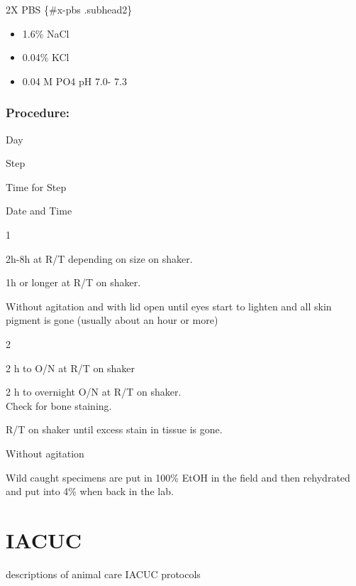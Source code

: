 \documentclass[
]{book}
\providecommand{\tightlist}{%
  \setlength{\itemsep}{0pt}\setlength{\parskip}{0pt}}
\begin{document}
2X PBS \{\#x-pbs .subhead2\}

\begin{itemize}
\tightlist
\item
  1.6\% NaCl
\item
  0.04\% KCl
\item
  0.04 M PO4 pH 7.0- 7.3
\end{itemize}

\hypertarget{procedure-9}{%
\subsection{Procedure:}\label{procedure-9}}

Day

Step

Time for Step

Date and Time

1

2h-8h at R/T depending on size on shaker.

1h or longer at R/T on shaker.

Without agitation and with lid open until eyes start to lighten and all
skin pigment is gone (usually about an hour or more)

2

2 h to O/N at R/T on shaker

2 h to overnight O/N at R/T on shaker.\\
Check for bone staining.

R/T on shaker until excess stain in tissue is gone.

Without agitation

Wild caught specimens are put in 100\% EtOH in the field and then
rehydrated and put into 4\% when back in the lab.

\hypertarget{iacuc}{%
\chapter{IACUC}\label{iacuc}}

descriptions of animal care IACUC protocols

  
\end{document}
